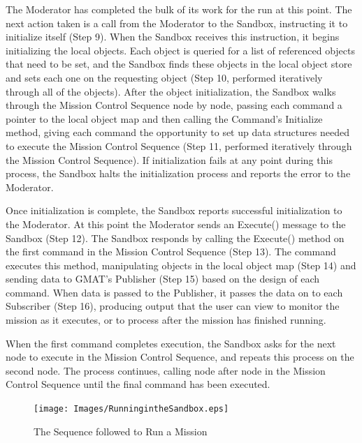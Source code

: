 \label{section:SandboxInitializationOverview}The Moderator has completed the bulk of its work for
the run at this point.  The next action taken is a call from the Moderator to the Sandbox,
instructing it to initialize itself (Step 9).  When the Sandbox receives this instruction, it begins
initializing the local objects.  Each object is queried for a list of referenced objects that need
to be set, and the Sandbox finds these objects in the local object store and sets each one on the
requesting object (Step 10, performed iteratively through all of the objects).  After the object
initialization, the Sandbox walks through the Mission Control Sequence node by node, passing each
command a pointer to the local object map and then calling the Command's Initialize method, giving
each command the opportunity to set up data structures needed to execute the Mission Control
Sequence  (Step 11, performed iteratively through the Mission Control Sequence).  If initialization
fails at any point during this process, the Sandbox halts the initialization process and reports the
error to the Moderator.

Once initialization is complete, the Sandbox reports successful initialization to the Moderator.  At
this point the Moderator sends an Execute() message to the Sandbox (Step 12).  The Sandbox responds
by calling the Execute() method on the first command in the Mission Control Sequence (Step 13).  The
command executes this method, manipulating objects in the local object map  (Step 14) and sending
data to GMAT's Publisher (Step 15) based on the design of each command.  When data is passed to the
Publisher, it passes the data on to each Subscriber (Step 16), producing output that the user can
view to monitor the mission as it executes, or to process after the mission has finished running.

When the first command completes execution, the Sandbox asks for the next node to execute in the
Mission Control Sequence, and repeats this process on the second node.  The process continues,
calling node after node in the Mission Control Sequence until the final command has been executed.

\begin{figure}[H]
\begin{center}
\texttt{[image: Images/RunningintheSandbox.eps]}
\caption{\label{figure:RunningBasicScript}The Sequence followed to Run a Mission}
\end{center}
\end{figure}

